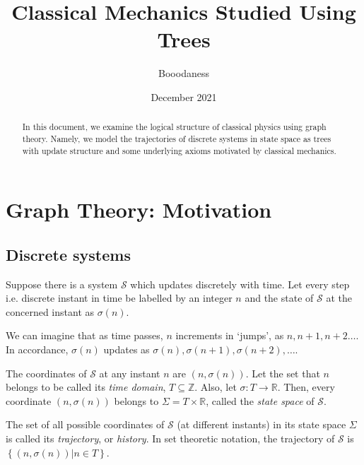 \documentclass[12 pt]{article}
\title{Classical Mechanics Studied Using Trees}
\author{Booodaness}
\date{December 2021}
\begin{document}

\begin{titlepage}
\maketitle
\begin{abstract}
In this document, we examine the logical structure of classical physics using graph theory. Namely, we model the trajectories of discrete systems in state space as trees with update structure and some underlying axioms motivated by classical mechanics.
\end{abstract}
\end{titlepage}

\setcounter{page}{2}

\tableofcontents

\clearpage
{}

\section{Graph Theory: Motivation}

\subsection{Discrete systems}

Suppose there is a system $\mathcal{S}$ which updates discretely with time. Let every step i.e. discrete instant in time be labelled by an integer $n$ and the state of $\mathcal{S}$ at the concerned instant as $\sigma \left( n \right)$.

We can imagine that as time passes, $n$ increments in `jumps', as $n, n+1, n+2 \dots$. In accordance, $\sigma \left( n \right)$ updates as $\sigma \left( n \right), \sigma \left( n+1 \right), \sigma \left( n+2 \right), \dots$.

The coordinates of $\mathcal{S}$ at any instant $n$ are $\left( n, \sigma \left( n \right) \right)$. Let the set that $n$ belongs to be called its \emph{time domain}, $T \subseteq \mathbb{Z}$. Also, let $\sigma : T \rightarrow \mathbb{R}$. Then, every coordinate $\left( n, \sigma \left( n \right) \right)$ belongs to $\Sigma = T \times \mathbb{R}$, called the \emph{state space} of $\mathcal{S}$.

The set of all possible coordinates of $\mathcal{S}$ (at different instants) in its state space $\Sigma$ is called its \emph{trajectory}, or \emph{history}. In set theoretic notation, the trajectory of $\mathcal{S}$ is $\left\{ \left( n, \sigma \left( n \right) \right) \vert n \in T \right\}$.
\end{document}
